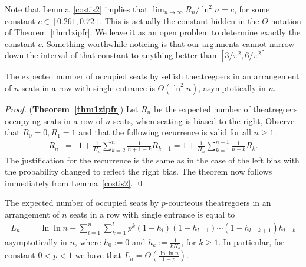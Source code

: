 \documentclass[11pt]{llncs}
\begin{document}
Note that Lemma~\ref{costis2} implies that $\lim_{n\rightarrow \infty} R_n/\ln^2 n =c$, 
for some constant $c \in [0.261, 0.72]$. This is actually the constant hidden in the $\Theta$-notation of Theorem~\ref{thm1zipfr}. We leave it as an open problem to determine exactly the constant $c$. Something worthwhile noticing is that our arguments cannot narrow down the interval of that constant to anything better than $[3/\pi^2, 6/\pi^2]$.



\begin{theorem}
\label{thm1zipfr}
The expected number of occupied seats by selfish theatregoers
in an arrangement of $n$ seats
in a row with single entrance is $\Theta( \ln^2 n)$, 
asymptotically in $n$.
\end{theorem}
\begin{proof} ({\bf Theorem~\ref{thm1zipfr}})
Let $R_n$ be the expected number of theatregoers occupying seats 
in a row of $n$ seats,
when seating is biased to the right,
Observe that $R_0=0, R_1 =1$ and that the following recurrence is valid
for all $n \geq 1$.
\begin{eqnarray}
R_n 
&=& \label{maineq1zz} 
1 + \frac{1}{H_n} \sum_{k=2}^{n} \frac{1}{n+1-k} R_{k-1}
= 
1 + \frac{1}{H_n} \sum_{k=1}^{n-1} \frac{1}{n-k} R_{k}.
\end{eqnarray}
The justification for the recurrence is the same as in the case of the left bias with
the probability changed to reflect the right bias. The theorem now follows immediately
from Lemma~\ref{costis2}. 
\qed
\end{proof}






\begin{theorem}
\label{thm2zipfl}
The expected number of occupied seats by $p$-courteous theatregoers
in an arrangement of $n$ seats
in a row with single entrance is equal to
\begin{eqnarray}
L_n 
&=& \label{maineq5zipf}
\ln \ln n +
\sum_{l=1}^n
\sum_{k=1}^l p^k 
\left( 1 - h_l \right)
\left( 1 - h_{l-1} \right)
\cdots
\left( 1 - h_{l-k+1} \right)
h_{l-k}
\end{eqnarray}
asymptotically in $n$, where $h_0 := 0$ and 
$h_k := \frac{1}{kH_k}$, for $k \geq 1$. In particular, for constant
$0< p < 1$ we have that $L_n = \Theta (\frac{\ln\ln n}{1-p})$.
\end{theorem}
\end{document}

